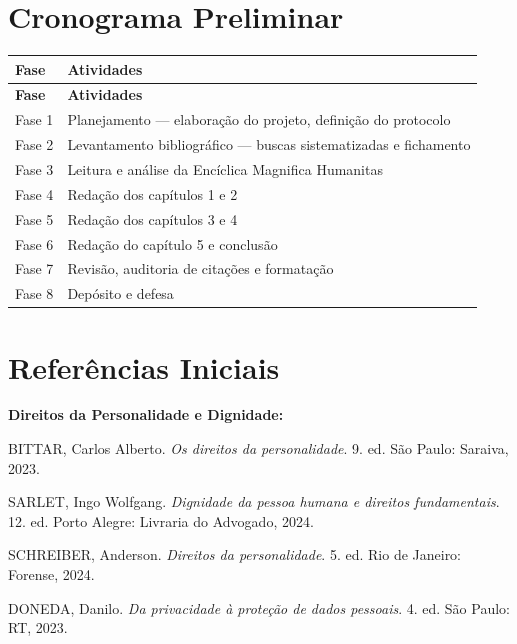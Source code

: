 \documentclass[12pt,a4paper]{article}
\begin{document}
\section{Cronograma Preliminar}

\medskip
\begin{longtable}{|p{3cm}|p{12cm}|}
\hline
\rowcolor[gray]{0.9}
\textbf{Fase} & \textbf{Atividades} \\
\hline
\endfirsthead
\hline
\rowcolor[gray]{0.9}
\textbf{Fase} & \textbf{Atividades} \\
\hline
\endhead
Fase 1 & Planejamento --- elaboração do projeto, definição do protocolo \\
\hline
Fase 2 & Levantamento bibliográfico --- buscas sistematizadas e fichamento \\
\hline
Fase 3 & Leitura e análise da Encíclica Magnifica Humanitas \\
\hline
Fase 4 & Redação dos capítulos 1 e 2 \\
\hline
Fase 5 & Redação dos capítulos 3 e 4 \\
\hline
Fase 6 & Redação do capítulo 5 e conclusão \\
\hline
Fase 7 & Revisão, auditoria de citações e formatação \\
\hline
Fase 8 & Depósito e defesa \\
\hline
\end{longtable}

\section{Referências Iniciais}

\textbf{Direitos da Personalidade e Dignidade:}

BITTAR, Carlos Alberto. \textit{Os direitos da personalidade}. 9. ed. São Paulo: Saraiva, 2023.

SARLET, Ingo Wolfgang. \textit{Dignidade da pessoa humana e direitos fundamentais}. 12. ed. Porto Alegre: Livraria do Advogado, 2024.

SCHREIBER, Anderson. \textit{Direitos da personalidade}. 5. ed. Rio de Janeiro: Forense, 2024.

DONEDA, Danilo. \textit{Da privacidade à proteção de dados pessoais}. 4. ed. São Paulo: RT, 2023.
\end{document}
